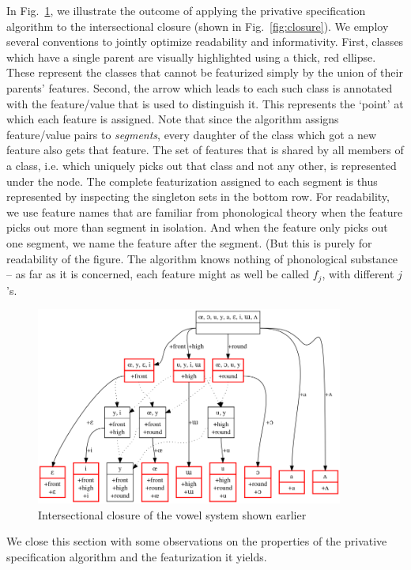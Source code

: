 \documentclass[11pt, oneside]{article}   	%
\begin{document}
In Fig.~\ref{fig:privative}, we illustrate the outcome of applying the privative specification algorithm to the intersectional closure (shown in Fig.~\ref{fig:closure}). We employ several conventions to jointly optimize readability and informativity. 
First, classes which have a single parent are visually highlighted using a thick, red ellipse. These represent the classes that cannot be featurized simply by the union of their parents' features. Second, the arrow which leads to each such class is annotated with the feature/value that is used to distinguish it. This represents the `point' at which each feature is assigned. Note that since the algorithm assigns feature/value pairs to \textit{segments}, every daughter of the class which got a new feature also gets that feature. The set of features that is shared by all members of a class, i.e. which uniquely picks out that class and not any other, is represented under the node. The complete featurization assigned to each segment is thus represented by inspecting the singleton sets in the bottom row. For readability, we use feature names that are familiar from phonological theory when the feature picks out more than segment in isolation. And when the feature only picks out one segment, we name the feature after the segment. (But this is purely for readability of the figure. The algorithm knows nothing of phonological substance -- as far as it is concerned, each feature might as well be called $f_j$, with different $j$'s. 

\begin{figure}[h]
\includegraphics[width=0.9\textwidth]{vowelHarmony_privative.png}
\caption{Intersectional closure of the vowel system shown earlier}
\label{fig:privative}
\end{figure}

We close this section with some observations on the properties of the privative specification algorithm and the featurization it yields. 
\end{document}

